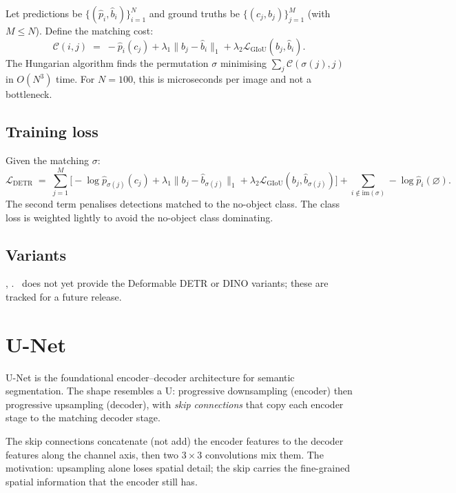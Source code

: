 Let predictions be $\{(\hat{p}_i, \hat{b}_i)\}_{i=1}^N$ and
ground truths be $\{(c_j, b_j)\}_{j=1}^M$ (with $M \leq N$).
Define the matching cost:
\[
  \mathcal{C}(i, j) \;=\; -\hat{p}_i(c_j) + \lambda_1 \|b_j - \hat{b}_i\|_1 + \lambda_2 \mathcal{L}_{\text{GIoU}}(b_j, \hat{b}_i).
\]
The Hungarian algorithm finds the permutation $\sigma$
minimising $\sum_j \mathcal{C}(\sigma(j), j)$ in $O(N^3)$ time.
For $N = 100$, this is microseconds per image and not a
bottleneck.

\subsection{Training loss}
\label{ssec:detection_segmentation:detr_loss}

Given the matching $\sigma$:
\[
  \mathcal{L}_{\text{DETR}} \;=\;
  \sum_{j=1}^M \bigl[
    -\log \hat{p}_{\sigma(j)}(c_j)
    + \lambda_1 \|b_j - \hat{b}_{\sigma(j)}\|_1
    + \lambda_2 \mathcal{L}_{\text{GIoU}}(b_j, \hat{b}_{\sigma(j)})
  \bigr]
  + \sum_{i \notin \text{im}(\sigma)} -\log \hat{p}_i(\varnothing).
\]
The second term penalises detections matched to the no-object
class. The class loss is weighted lightly to avoid the
no-object class dominating.

\subsection{Variants}
\label{ssec:detection_segmentation:detr_variants}

, .
\Lucid\ does not yet provide the Deformable DETR or DINO
variants; these are tracked for a future release.

\section{U-Net}
\label{sec:detection_segmentation:unet}

U-Net \cite{ronneberger_unet_2015} is the foundational
encoder--decoder architecture for semantic segmentation. The
shape resembles a U: progressive downsampling (encoder) then
progressive upsampling (decoder), with \emph{skip connections}
that copy each encoder stage to the matching decoder stage.

The skip connections concatenate (not add) the encoder
features to the decoder features along the channel axis, then
two $3 \times 3$ convolutions mix them. The motivation:
upsampling alone loses spatial detail; the skip carries the
fine-grained spatial information that the encoder still has.

